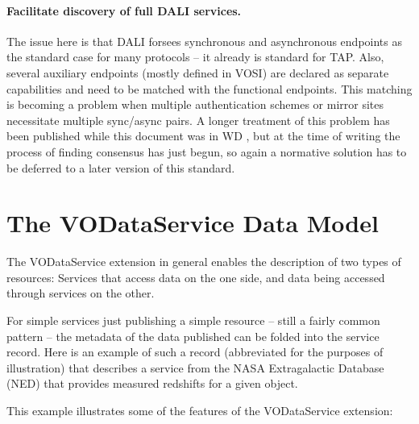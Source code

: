 \documentclass[11pt,a4paper]{ivoa}
\begin{document}
\paragraph{Facilitate discovery of full DALI services.}  The issue here
is that DALI forsees synchronous and asynchronous endpoints as the
standard case for many protocols -- it already is standard for TAP.
Also, several auxiliary endpoints (mostly defined in VOSI) are declared as
separate capabilities and need to be matched with the functional
endpoints.  This matching is becoming a problem when multiple
authentication schemes or mirror sites necessitate multiple sync/async
pairs.  A longer treatment of this problem has been published while this
document was in WD \citep{note:caproles}, but at the time of writing the
process of finding consensus has just begun, so again a normative
solution has to be deferred to a later version of this standard.



\section{The VODataService Data Model}
\label{sect:model}


The VODataService extension in general enables the description of two
types of resources:  Services that access data on the one side, and data
being accessed through services on the other.

For simple services just publishing a simple resource -- still a fairly
common pattern -- the metadata of the data published can be folded into
the service record.
Here is an example of such a record (abbreviated for the
purposes of illustration) that describes a service from the NASA
Extragalactic Database (NED) that provides measured redshifts for a
given object.




This example illustrates some of the features of the VODataService
extension:
\end{document}
